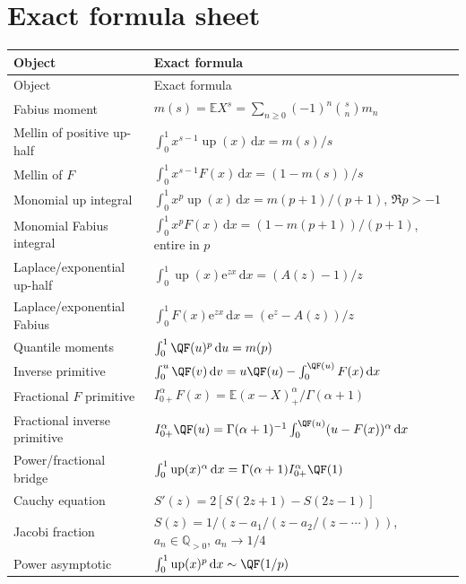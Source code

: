\documentclass[11pt,oneside]{article}
\theoremstyle{definition}
\theoremstyle{remark}
\newcommand{\Up}{\operatorname{up}}
\newcommand{\E}{\mathbb E}
\newcommand{\dd}{\,\mathrm d}
\newcommand{\e}{\mathrm e}
\newcommand{\1}{\mathbf 1}
\begin{document}
\appendix

\section{Exact formula sheet}
\label{p8:app:formula-sheet}

\begin{longtable}{@{}p{}p{}@{}}
\toprule
Object & Exact formula \\
\midrule
\endfirsthead
\toprule
Object & Exact formula \\
\midrule
\endhead
Fabius moment
& \(m(s)=\E X^s=\sum_{n\ge0}(-1)^n\binom{s}{n}m_n\) \\
Mellin of positive up-half
& \(\int_0^1x^{s-1}\Up(x)\dd x=m(s)/s\) \\
Mellin of \(F\)
& \(\int_0^1x^{s-1}F(x)\dd x=(1-m(s))/s\) \\
Monomial up integral
& \(\int_0^1x^p\Up(x)\dd x=m(p+1)/(p+1)\), \(\Re p>-1\) \\
Monomial Fabius integral
& \(\int_0^1x^pF(x)\dd x=(1-m(p+1))/(p+1)\), entire in \(p\) \\
Laplace/exponential up-half
& \(\int_0^1\Up(x)\e^{zx}\dd x=(A(z)-1)/z\) \\
Laplace/exponential Fabius
& \(\int_0^1F(x)\e^{zx}\dd x=(\e^z-A(z))/z\) \\
Quantile moments
& \(\int_0^1\QF(u)^p\dd u=m(p)\) \\
Inverse primitive
& \(\int_0^u\QF(v)\dd v=u\QF(u)-\int_0^{\QF(u)}F(x)\dd x\) \\
Fractional \(F\) primitive
& \(I_{0+}^{\alpha}F(x)=\E(x-X)_+^\alpha/\Gamma(\alpha+1)\) \\
Fractional inverse primitive
& \(I_{0+}^{\alpha}\QF(u)=\Gamma(\alpha+1)^{-1}\int_0^{\QF(u)}(u-F(x))^\alpha\dd x\) \\
Power/fractional bridge
& \(\int_0^1\Up(x)^\alpha\dd x=\Gamma(\alpha+1)I_{0+}^{\alpha}\QF(1)\) \\
Cauchy equation
& \(S'(z)=2[S(2z+1)-S(2z-1)]\) \\
Jacobi fraction
& \(S(z)=1/(z-a_1/(z-a_2/(z-\cdots)))\), \(a_n\in\mathbb Q_{>0}\), \(a_n\to1/4\) \\
Power asymptotic
& \(\int_0^1\Up(x)^p\dd x\sim\QF(1/p)\) \\
\bottomrule
\end{longtable}

\end{document}
